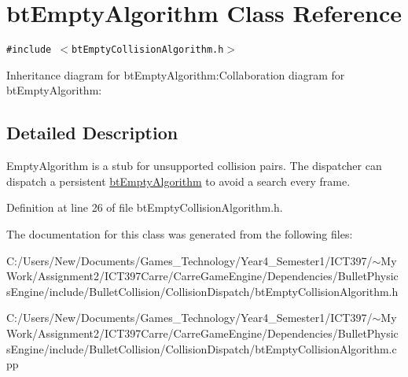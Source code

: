 \hypertarget{classbt_empty_algorithm}{
\section{btEmptyAlgorithm Class Reference}
\label{classbt_empty_algorithm}
}
{\tt \#include $<$btEmptyCollisionAlgorithm.h$>$}

Inheritance diagram for btEmptyAlgorithm:Collaboration diagram for btEmptyAlgorithm:

\subsection{Detailed Description}
EmptyAlgorithm is a stub for unsupported collision pairs. The dispatcher can dispatch a persistent \hyperlink{classbt_empty_algorithm}{btEmptyAlgorithm} to avoid a search every frame. 

Definition at line 26 of file btEmptyCollisionAlgorithm.h.

The documentation for this class was generated from the following files:\begin{CompactItemize}
\item 
C:/Users/New/Documents/Games\_\-Technology/Year4\_\-Semester1/ICT397/$\sim$My Work/Assignment2/ICT397Carre/CarreGameEngine/Dependencies/BulletPhysicsEngine/include/BulletCollision/CollisionDispatch/btEmptyCollisionAlgorithm.h\item 
C:/Users/New/Documents/Games\_\-Technology/Year4\_\-Semester1/ICT397/$\sim$My Work/Assignment2/ICT397Carre/CarreGameEngine/Dependencies/BulletPhysicsEngine/include/BulletCollision/CollisionDispatch/btEmptyCollisionAlgorithm.cpp\end{CompactItemize}
